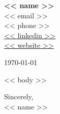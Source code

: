 \documentclass[11pt, a4paper]{article}
\begin{document}
\begin{flushright}
\textbf{\Huge << name >> } \\
\vspace{1em}
<< email >> \\
<< phone >> \\
\href{https://<< linkedin >>}{<< linkedin >>} \\
\href{https://<< website >>}{<< website >>}
\end{flushright}

\vspace{2em}

\today

\vspace{2em}

<< body >>

\vspace{2em}

Sincerely, \\
\vspace{1em}
<< name >>
\end{document}
